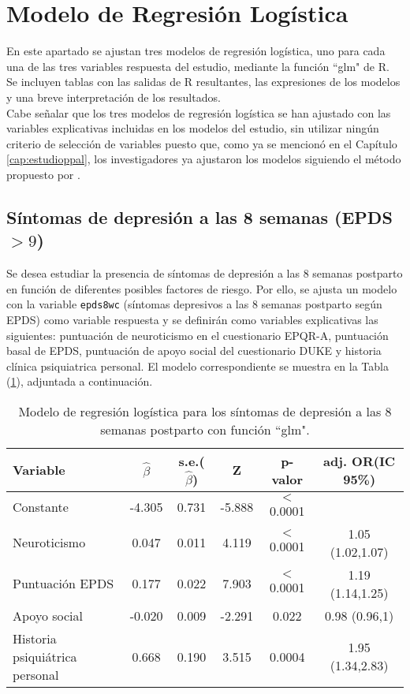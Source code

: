 \section{Modelo de Regresión Logística}\label{cap:aplicacionlogistica}

En este apartado se ajustan tres modelos de regresión logística, uno para cada una de las tres variables respuesta del estudio, mediante la función ``glm" de R. Se incluyen tablas con las salidas de R resultantes, las expresiones de los modelos y una breve interpretación de los resultados. \\

Cabe señalar que los tres modelos de regresión logística se han ajustado con las variables explicativas incluidas en los modelos del estudio, sin utilizar ningún criterio de selección de variables puesto que, como ya se mencionó en el Capítulo \ref{cap:estudioppal}, los investigadores ya ajustaron los modelos siguiendo el método propuesto por \textcite{hosmer}.

\subsection{Síntomas de depresión a las 8 semanas (EPDS$>9$)}

Se desea estudiar la presencia de síntomas de depresión a las 8 semanas postparto en función de diferentes posibles factores de riesgo. Por ello, se ajusta un modelo con la variable \lstinline{epds8wc} (síntomas depresivos a las 8 semanas postparto según EPDS) como variable respuesta y se definirán como variables explicativas las siguientes: puntuación de neuroticismo en el cuestionario EPQR-A, puntuación basal de EPDS, puntuación de apoyo social del cuestionario DUKE y historia clínica psiquiatrica personal. El modelo correspondiente se muestra en la Tabla (\ref{tab:7}), adjuntada a continuación.
\begin{table} [h!]
	\centering
	\begin{tabular}{l c c c c c}
		\toprule
		\textbf{Variable} & $\hat{\beta}$ & s.e.($\hat{\beta}$) & Z & p-valor & adj. OR(IC 95\%)\\
		\midrule
		Constante & -4.305 &  0.731& -5.888  & $<$ 0.0001 &  \\
		Neuroticismo &  0.047   & 0.011   & 4.119 & $<$ 0.0001  & 1.05 (1.02,1.07) \\
		Puntuación EPDS & 0.177  &  0.022  & 7.903 &$<$ 0.0001  &1.19 (1.14,1.25) \\
		Apoyo social &  -0.020  &    0.009  &-2.291  & 0.022 &0.98 (0.96,1) \\
		Historia psiquiátrica personal & 0.668  & 0.190 &  3.515 & 0.0004  &1.95 (1.34,2.83) \\
		\bottomrule
	\end{tabular}
	\caption{Modelo de regresión logística para los síntomas de depresión a las 8 semanas postparto con función ``glm".}
	\label{tab:7}
\end{table}

